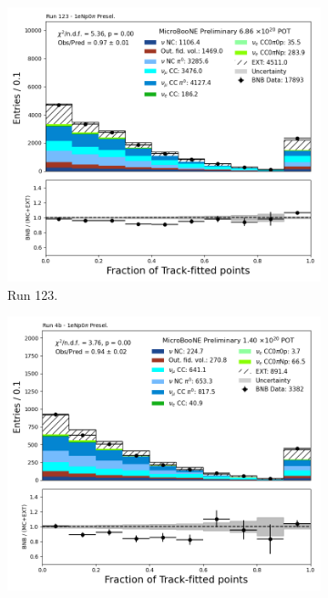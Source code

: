 \begin{figure}[H]
    \centering
    \begin{subfigure}[t]{0.32\linewidth}
        \includegraphics[width=\linewidth]{technote/Appendix_Preselection/Figures/1eNp0pi/Run123/trkfit_Run123_1eNp0pi_Presel.png}
        \caption{Run 123.}
    \end{subfigure}%
    \hspace{0.2cm}%
    \begin{subfigure}[t]{0.32\linewidth}
        \includegraphics[width=\linewidth]{technote/Appendix_Preselection/Figures/1eNp0pi/Run4b/trkfit_Run4b_1eNp0pi_Presel.png}

\end{subfigure}
\end{figure}
